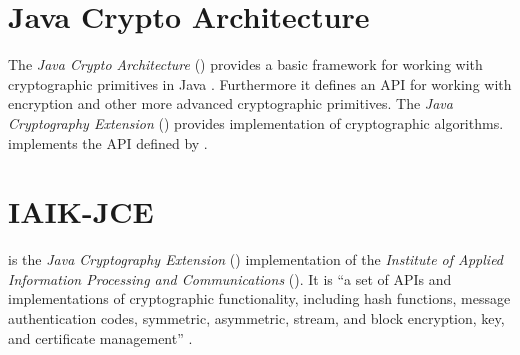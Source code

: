 



\section{Java Crypto Architecture} \label{section:pre:jca}

The \textit{Java Crypto Architecture} () provides a basic framework for working with cryptographic primitives in Java \cite{JCA}. Furthermore it defines an API for working with encryption and other more advanced cryptographic primitives.
The \textit{Java Cryptography Extension} () provides implementation of cryptographic algorithms.  implements the API defined by . 

\section{IAIK-JCE} \label{section:pre:jce} 


 is the \textit{Java Cryptography Extension} ()  implementation of the \textit{Institute of Applied Information Processing and Communications} (). It is ``a set of APIs and implementations of cryptographic functionality, including hash functions, message authentication codes, symmetric, asymmetric, stream, and block encryption, key, and certificate management'' \cite{IAIKJCE}.



